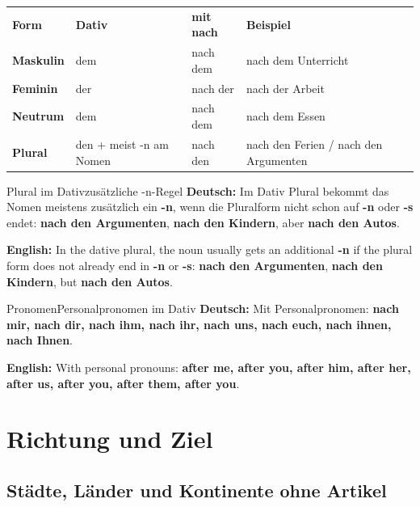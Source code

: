 \documentclass[a4paper,11pt]{article}
\newcommand{\GermanText}[1]{\textbf{Deutsch: }#1\par}
\newcommand{\EnglishText}[1]{{\small\color{SoftGray}\textbf{English: }#1\par}}
\begin{document}
        \begin{longtable}{>{\bfseries}p{2.8cm}|p{3.2cm}|p{3.4cm}|p{4.5cm}}
            \rowcolor{HeaderBlueDark}
            \color{white}\textbf{Form} &
            \color{white}\textbf{Dativ} &
            \color{white}\textbf{mit nach} &
            \color{white}\textbf{Beispiel} \\
            Maskulin & dem & nach dem & nach dem Unterricht \\
            Feminin & der & nach der & nach der Arbeit \\
            Neutrum & dem & nach dem & nach dem Essen \\
            Plural & den + meist -n am Nomen & nach den & nach den Ferien / nach den Argumenten \\
        \end{longtable}

        \begin{grammarentry}{Plural im Dativ}{zusätzliche -n-Regel}
            \GermanText{Im Dativ Plural bekommt das Nomen meistens zusätzlich ein \textbf{-n}, wenn die Pluralform nicht schon auf \textbf{-n} oder \textbf{-s} endet: \textbf{nach den Argumenten}, \textbf{nach den Kindern}, aber \textbf{nach den Autos}.}
            \EnglishText{In the dative plural, the noun usually gets an additional \textbf{-n} if the plural form does not already end in \textbf{-n} or \textbf{-s}: \textbf{nach den Argumenten}, \textbf{nach den Kindern}, but \textbf{nach den Autos}.}
        \end{grammarentry}

        \begin{grammarentry}{Pronomen}{Personalpronomen im Dativ}
            \GermanText{Mit Personalpronomen: \textbf{nach mir, nach dir, nach ihm, nach ihr, nach uns, nach euch, nach ihnen, nach Ihnen}.}
            \EnglishText{With personal pronouns: \textbf{after me, after you, after him, after her, after us, after you, after them, after you}.}
        \end{grammarentry}


    \section{Richtung und Ziel}

        \subsection{Städte, Länder und Kontinente ohne Artikel}
\end{document}
